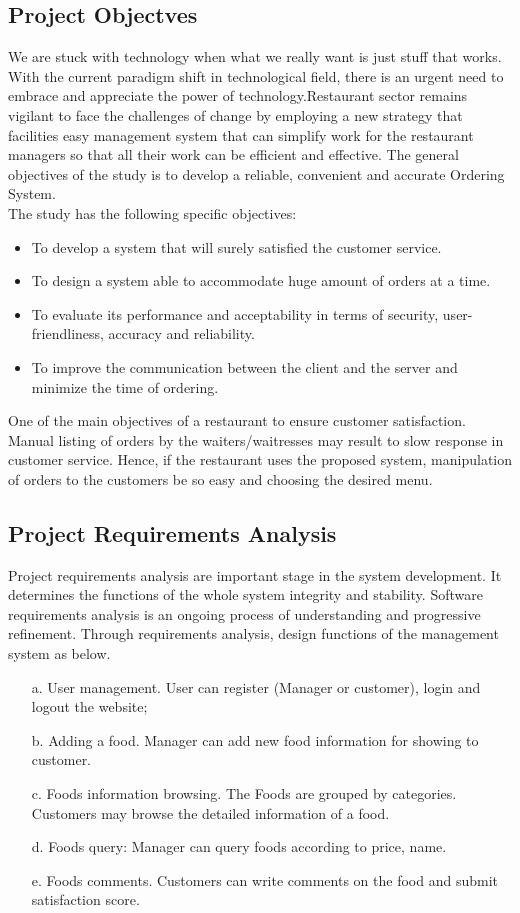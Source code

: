 \documentclass[12pt,a4paper]{article}
\newcommand\tab[1][1cm]{\hspace*{#1}}
\begin{document}
	
	\subsection{Project Objectves}
	\tab We are stuck with technology when what we really want is just stuff that works. With
the current paradigm shift in technological field, there is an urgent need to embrace and
appreciate the power of technology.Restaurant sector remains vigilant to face the challenges
of change by employing a new strategy that facilities easy management system that can
simplify work for the restaurant managers so that all their work can be efficient and effective.
The general objectives of the study is to develop a reliable, convenient and accurate Ordering System.\\
The study has the following specific objectives:
		\begin{itemize}
			\item To develop a system that will surely satisfied the customer service.
			\item To design a system able to accommodate huge amount of orders at a time.
			\item  To evaluate its performance and acceptability in terms of security, user-friendliness, accuracy and reliability.
			\item  To improve the communication between the client and the server and minimize the time of ordering.
		\end{itemize}
		
\RaggedRight One of the main objectives of a restaurant to ensure customer satisfaction. Manual listing of orders by the waiters/waitresses may result to slow response in customer service. Hence, if the restaurant uses the proposed system, manipulation of orders to the customers be so easy and choosing the desired menu.

	\subsection{Project Requirements Analysis}
	\tab Project requirements analysis are important stage in the system development. It
determines the functions of the whole system integrity and stability. Software requirements
analysis is an ongoing process of understanding and progressive refinement. Through
requirements analysis, design functions of the management system as below.
			\begin{itemize}
				\item[a.]User management. User can register (Manager or customer), login and logout the website;
				\item[b.]Adding a food. Manager can add new food information for showing to customer.
				\item[c.]Foods information browsing. The Foods are grouped by categories. Customers may
browse the detailed information of a food.
				\item[d.]Foods query: Manager can query foods according to price, name.
				\item[e.]Foods comments. Customers can write comments on the food and submit satisfaction
score.
			\end{itemize}
\end{document}

